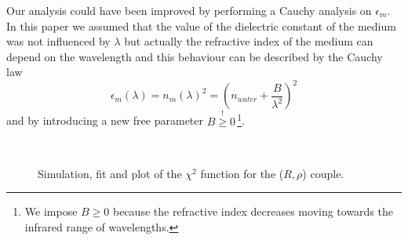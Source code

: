 \documentclass[twocolumn]{article}
\begin{document}
\begin{multicols}{2}
Our analysis could have been improved by performing a Cauchy analysis on $\epsilon_m$. In this paper we assumed that the value of the dielectric constant of the medium was not influenced by $\lambda$ but actually the refractive index of the medium can depend on the wavelength and this behaviour can be described by the Cauchy law
\begin{equation*}
\epsilon_{m}(\lambda)=n_{m}(\lambda)^{2}=\left(n_{water}+\frac{B}{\lambda^{2}}\right)^{2}
\end{equation*}
and by introducing a new free parameter $B\overset{!}{\geq} 0$\,\footnote{We impose $B\geq 0$ because the refractive index decreases moving towards the infrared range of wavelengths.}.


\end{multicols}
\newpage
\begin{figure}[H]
\centering
{} 
 \\
\caption{Simulation, fit and plot of the $\chi^2$ function for the ($R,\rho$) couple.}
\label{fig:r_rho}
\end{figure}
\end{document}
